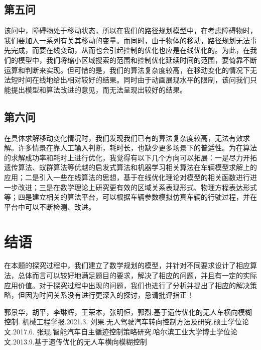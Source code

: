 \documentclass{article}
\begin{document}
	\subsection{第五问}
	该问中，障碍物处于移动状态，所以在我们的路径规划模型中，在考虑障碍物时，我们要加入一系列有关其移动的变量。而同时，由于物体的移动，路径规划无法事先完成，而要在线变动，从而也会引起控制的优化也应是在线优化的。为此，在我们的模型中，我们将缩小区域搜索的范围和控制优化延续时间的范围，要倚靠不断运算和判断来实现。但可惜的是，我们的算法复杂度较高，在移动变化的情况下无法短时间在线地给出相对较好的结果。同时由于动画展现水平的限制，该问我们只能提出模型和算法改进的意见，而无法呈现出较好的结果。
	\subsection{第六问}
	在具体求解移动变化情况时，我们发现我们已有的算法复杂度较高，无法有效求解。许多情景在靠人工输入判断，耗时长，也缺少更多场景下的普适性。为在算法的求解成功率和耗时上进行优化，我觉得有以下几个方向可以拓展：一是尽力开拓遗传算法、蚁群算法等优越的启发式算法和机器学习相关算法在车辆模型求解上的应用；二是引入一些在线算法的思想，基于在线优化理论对模型的相关函数进行进一步改进；三是在数学理论上研究更有效的区域关系表现形式、物理方程表达形式等；四是建立相关的算法平台，可以根据车辆参数模拟仿真车辆的行驶过程，并在平台中可以不断检测、改进。
	\section{结语}
	在本题的探究过程中，我们建立了数学规划的模型，并针对不同要求设计了相应算法，总体而言可以较好地满足题目的要求，解决了相应的问题，并且有一定的实际应用价值。对于探究过程中出现的问题，我们也进行了分析并提出了相应的解决策略，但因为时间关系没有进行更深入的探讨，恳请批评指正！

	\begin{thebibliography}{10}  
		郭景华，胡平，李琳辉，王荣本，张明恒，郭烈.基于遗传优化的无人车横向模糊控制. 机械工程学报.2021.3.
		刘果.无人驾驶汽车转向控制方法及研究.硕士学位论文.2017.6.
		张琨.智能汽车自主循迹控制策略研究.哈尔滨工业大学博士学位论文.2013.9.基于遗传优化的无人车横向模糊控制
	\end{thebibliography}
	
\end{document}
